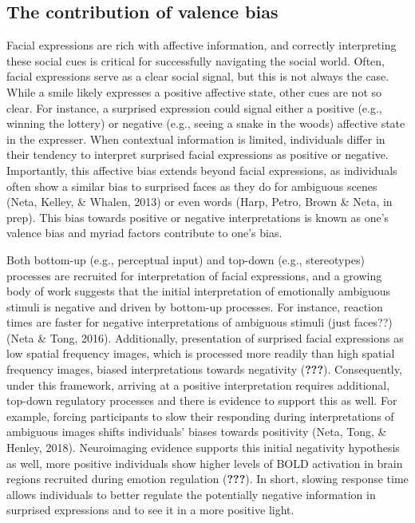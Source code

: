 \documentclass[man]{apa6}
\begin{document}
\hypertarget{the-contribution-of-valence-bias}{%
\subsection{The contribution of valence bias}\label{the-contribution-of-valence-bias}}

Facial expressions are rich with affective information, and correctly interpreting these social cues is critical for successfully navigating the social world. Often, facial expressions serve as a clear social signal, but this is not always the case. While a smile likely expresses a positive affective state, other cues are not so clear. For instance, a surprised expression could signal either a positive (e.g., winning the lottery) or negative (e.g., seeing a snake in the woods) affective state in the expresser. When contextual information is limited, individuals differ in their tendency to interpret surprised facial expressions as positive or negative. Importantly, this affective bias extends beyond facial expressions, as individuals often show a similar bias to surprised faces as they do for ambiguous scenes (Neta, Kelley, \& Whalen, 2013) or even words (Harp, Petro, Brown \& Neta, in prep). This bias towards positive or negative interpretations is known as one's valence bias and myriad factors contribute to one's bias.

Both bottom-up (e.g., perceptual input) and top-down (e.g., stereotypes) processes are recruited for interpretation of facial expressions, and a growing body of work suggests that the initial interpretation of emotionally ambiguous stimuli is negative and driven by bottom-up processes. For instance, reaction times are faster for negative interpretations of ambiguous stimuli (just faces??) (Neta \& Tong, 2016). Additionally, presentation of surprised facial expressions as low spatial frequency images, which is processed more readily than high spatial frequency images, biased interpretations towards negativity ({\textbf{???}}). Consequently, under this framework, arriving at a positive interpretation requires additional, top-down regulatory processes and there is evidence to support this as well. For example, forcing participants to slow their responding during interpretations of ambiguous images shifts individuals' biases towards positivity (Neta, Tong, \& Henley, 2018). Neuroimaging evidence supports this initial negativity hypothesis as well, more positive individuals show higher levels of BOLD activation in brain regions recruited during emotion regulation ({\textbf{???}}). In short, slowing response time allows individuals to better regulate the potentially negative information in surprised expressions and to see it in a more positive light.
\end{document}
